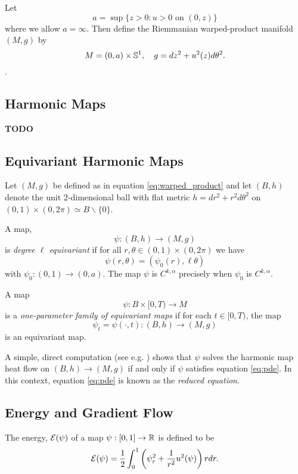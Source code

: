 \documentclass{amsart}
\begin{document}
Let
\[
a = \sup\{z > 0: u > 0 \text{ on } (0, z)\}
\]
where we allow \(a = \infty\). Then define the Riemmanian warped-product manifold \((M, g)\) by
\begin{equation}
\label{eq:warped_product}
M = (0, a) \times \S^1, \quad g = dz^2 + u^2(z) d\theta^2.
\end{equation}
.

\subsection{Harmonic Maps}
\label{subsec:harmonic_maps}

\textbf{TODO}

\subsection{Equivariant Harmonic Maps}
\label{subsec:equivariant}

Let \((M, g)\) be defined as in equation \eqref{eq:warped_product} and let \((B, h)\) denote the unit \(2\)-dimensional ball with flat metric \(h = dr^2 + r^2 d\theta^2\) on \((0, 1) \times (0, 2\pi) \simeq B \backslash \{0\}\).

\begin{defn}
A map,
\[
\psi: (B, h) \to (M, g)
\]
is \emph{degree \(\ell\) equivariant} if for all \(r, \theta \in (0, 1) \times (0, 2\pi)\) we have 
\[
\psi(r, \theta) = (\psi_0(r), \ell \theta)
\]
with \(\psi_0 : (0, 1) \to (0, a)\). The map \(\psi\) is \(C^{k,\alpha}\) precisely when \(\psi_0\) is \(C^{k,\alpha}\).

A map
\[
\psi : B \times [0, T) \to M
\]
is a \emph{one-parameter family of equivariant maps} if for each \(t \in [0, T)\), the map
\[
\psi_t = \psi(\cdot, t) : (B, h) \to (M, g)
\]
is an equivariant map.
\end{defn}

A simple, direct computation (see e.g. \cite{}) shows that \(\psi\) solves the harmonic map heat flow on \((B, h) \to (M, g)\) if and only if \(\psi\) satisfies equation \eqref{eq:pde}. In this context, equation \eqref{eq:pde} is known as the \emph{reduced equation}.

\subsection{Energy and Gradient Flow}
\label{subsec:intro_energygradient}

\begin{defn}
\label{defn:energy}
The energy, \(\operatorname{\mathcal{E}}(\psi)\) of a map \(\psi: [0, 1] \to \mathbb{R}\) is defined to be
\[
\operatorname{\mathcal{E}}(\psi) = \frac{1}{2} \int_0^1 \left(\psi_r^2 + \frac{1}{r^2} u^2(\psi)\right) r dr.
\]
\end{defn}
\end{document}

